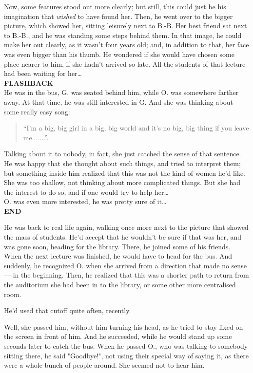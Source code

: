 Now, some features stood out more clearly; but still, this could just be his imagination that \emph{wished} to have found her. Then, he went over to the bigger picture, which showed her, sitting leisurely next to B.-B. 
Her best friend sat next to B.-B., and he was standing some steps behind them. In that image, he could make her out clearly, as it wasn't four years old; and, in addition to that, her face was even bigger than his thumb. 
He wondered if she would have chosen some place nearer to him, if she hadn't arrived so late. All the students of that lecture had been waiting for her\dots{}\\
\textbf{FLASHBACK}\\
He was in the bus, G. was seated behind him, while O. was somewhere farther away. At that time, he was still interested in G. 
And she was thinking about some really easy song: 
\begin{quote}
  \enquote{I'm a big, big girl in a big, big world and it's no big, big thing if you leave me.......}.
\end{quote}
Talking about it to nobody, in fact, she just catched the sense of that sentence. 
He was happy that she thought about such things, and tried to interpret them; but something inside him realized that this was not the kind of women he'd like. She was too shallow, not thinking about more complicated things. But she had the interest to do so, and if one would try to help her\dots{}\\
O. was even more interested, he was pretty sure of it\dots{}\\
\textbf{END}

He was back to real life again, walking once more next to the picture that showed the mass of students. 
He'd accept that he wouldn't be sure if that was her, and was gone soon, heading for the library. There, he joined some of his friends. 
When the next lecture was finished, he would have to head for the bus. 
And suddenly, he recognized O. when she arrived from a direction that made no sense --- in the beginning. Then, he realized that this was a shorter path to return from the auditorium she had been in to the library, or some other more centralised room.

He'd used that cutoff quite often, recently. 

Well, she passed him, without him turning his head, as he tried to stay fixed on the screen in front of him. 
And he succeeded, while he would stand up some seconds later to catch the bus. When he passed O., who was talking to somebody sitting there, he said "Goodbye!", not using their special way of saying it, as there were a whole bunch of people around. 
She seemed not to hear him.

